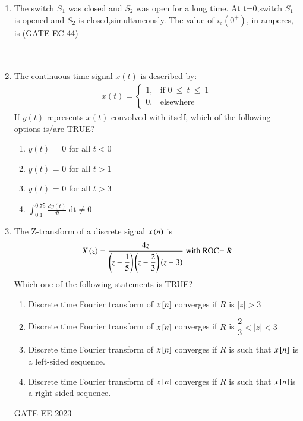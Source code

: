 \begin{enumerate}[label=\thechapter.\arabic*,ref=\thechapter.\theenumi]
\newpage
\item The switch $S_1$ was closed and $S_2$ was open for a long time. At t=0,switch $S_1$ is opened and $S_2$ is closed,simultaneously. The value of $i_c(0^{+})$, in amperes, is  \hfill (GATE EC 44)\\
\\
\solution \\

\newpage

\item The continuous time signal $x(t)$ is described by:
\begin{align}
x(t)=
    \begin{cases}
        1, & \text{if } 0\: {\displaystyle \leq }\:t\:{\displaystyle \leq }\:1\\
        0, & \text{elsewhere}
    \end{cases} 
\end{align}
If $y(t)$ represents $x(t)$ convolved with itself, which of the following options is/are TRUE?
\begin{enumerate}[label = \Alph*]
    \item $y(t)$ = 0 for all $t<0$\\
    \item $y(t)$ = 0 for all $t>1$\\
    \item $y(t)$ = 0 for all $t>3$\\
    \item $\int_{0.1}^{0.75} \frac{dy(t)}{dt}\: \text{dt} \neq 0$
\end{enumerate}
\solution
\newpage

\item The Z-transform of a discrete signal $x\left(n\right)$ is
\begin{align}
X\left(z\right)=\dfrac{4z}{\left(z-\dfrac{1}{5}\right) \left(z-\dfrac{2}{3}\right) \left(z-3\right)} \text{ with ROC= }R
\end{align}
Which one of the following statements is TRUE?
\begin{enumerate}[label = (\alph*)]
     \item Discrete time Fourier transform of $x{}\left[n\right]$ converges if $R$ is $|z|>3$\\
     \item Discrete time Fourier transform of $x{}\left[n\right]$ converges if $ R$ is $\dfrac{2}{3}<|z|<3$\\
     \item Discrete time Fourier transform of $x{}\left[n\right]$ converges if $R$ is such that $x{}\left[n\right]$ is a left-sided sequence.\\
     \item Discrete time Fourier transform of $x{}\left[n\right]$ converges if $R$ is such that $x{}\left[n\right]$is a right-sided sequence.\\
 \end{enumerate} \hfill{GATE EE 2023}	\\
 \solution
 
 \newpage
 

\end{enumerate}
